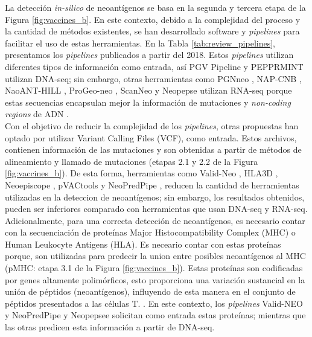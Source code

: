 \documentclass[a4paper]{article}
\begin{document}
	
La detección \textit{in-silico} de neoantígenos se basa en la segunda y tercera etapa de la Figura \ref{fig:vaccines_b}. En este contexto, debido a la complejidad del proceso y la cantidad de métodos existentes, se han desarrollado software y \textit{pipelines} para facilitar el uso de estas herramientas. En la Tabla \ref{tab:review_pipelines}, presentamos los \textit{pipelines} publicados a partir del 2018. Estos \textit{pipelines} utilizan diferentes tipos de información como entrada, así PGV Pipeline \citep{rubinsteyn2018computational} y PEPPRMINT \citep{zhou2023prioritizing} utilizan DNA-seq; sin embargo, otras herramientas como PGNneo \citep{tan2023pgnneo}, NAP-CNB \citep{wert2021predicting}, NaoANT-HILL \citep{coelho2020neoant}, ProGeo-neo \citep{li2020progeo}, ScanNeo \citep{wang2019scanneo} y Neopepse \citep{kim2018neopepsee} utilizan RNA-seq porque estas secuencias encapsulan mejor la información de mutaciones y \textit{non-coding regions} de ADN \citep{tan2023pgnneo}. \\

Con el objetivo de reducir la complejidad de los \textit{pipelines}, otras propuestas han optado por utilizar Variant Calling Files (VCF), como entrada. Estos archivos, contienen información de las mutaciones y son obtenidas a partir de métodos de alineamiento y llamado de mutaciones (etapas 2.1 y 2.2 de la Figura \ref{fig:vaccines_b}). De esta forma, herramientas como Valid-Neo \citep{terai2022valid}, HLA3D \citep{li2022hla3d}, Neoepiscope \citep{wood2020neoepiscope} , pVACtools \citep{hundal2020pvactools} y NeoPredPipe \citep{schenck2019neopredpipe}, reducen la cantidad de herramientas utilizadas en la deteccion de neoantígenos; sin embargo, los resultados obtenidos, pueden ser inferiores comparado con herramientas que usan DNA-seq y RNA-seq.\\

Adicionalmente, para una correcta detección de neoantígenos, es necesario contar con la secuenciación de proteínas Major Histocompatibility Complex (MHC) o Human Leukocyte Antigens (HLA). Es neceario contar con estas proteínas porque, son utilizadas para predecir la union entre posibles neoantígenos al MHC (pMHC: etapa 3.1 de la Figura \ref{fig:vaccines_b}). Estas proteínas son codificadas por genes altamente polimórficos, esto proporciona una variación sustancial en la unión de péptidos (neoantígenos), influyendo de esta manera en el conjunto de péptidos presentados a las células T. \citep{abualrous2021major}. En este contexto,  los \textit{pipelines} Valid-NEO \citep{terai2022valid}  y NeoPredPipe \citep{schenck2019neopredpipe} y Neopepsee \citep{kim2018neopepsee} solicitan como entrada estas proteínas; mientras que las otras predicen esta información a partir de DNA-seq.
\end{document}
